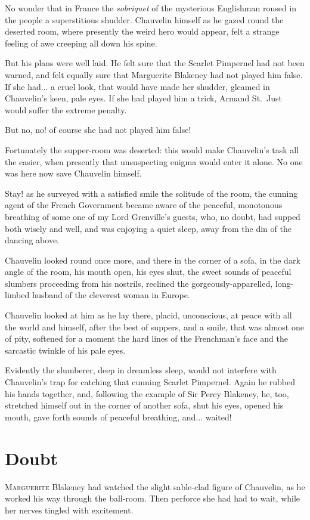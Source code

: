 \documentclass[paper=a5,BCOR=7mm,twoside,DIV=calc,12pt,usegeometry,chapterprefix,endperiod,headings=big]{scrbook}
\begin{document}
No wonder that in France the \textit{sobriquet} of the mysterious Englishman roused in the people a superstitious shudder. Chauvelin himself as he gazed round the deserted room, where presently the weird hero would appear, felt a strange feeling of awe creeping all down his spine.

But his plans were well laid. He felt sure that the Scarlet Pimpernel had not been warned, and felt equally sure that Marguerite Blakeney had not played him false. If she had... a cruel look, that would have made her shudder, gleamed in Chauvelin's keen, pale eyes. If she had played him a trick, Armand St.~Just would suffer the extreme penalty.

But no, no! of course she had not played him false!

Fortunately the supper-room was deserted: this would make Chauvelin's task all the easier, when presently that unsuspecting enigma would enter it alone. No one was here now save Chauvelin himself.

Stay! as he surveyed with a satisfied smile the solitude of the room, the cunning agent of the French Government became aware of the peaceful, monotonous breathing of some one of my Lord Grenville's guests, who, no doubt, had supped both wisely and well, and was enjoying a quiet sleep, away from the din of the dancing above.

Chauvelin looked round once more, and there in the corner of a sofa, in the dark angle of the room, his mouth open, his eyes shut, the sweet sounds of peaceful slumbers proceeding from his nostrils, reclined the gorgeously-apparelled, long-limbed husband of the cleverest woman in Europe.

Chauvelin looked at him as he lay there, placid, unconscious, at peace with all the world and himself, after the best of suppers, and a smile, that was almost one of pity, softened for a moment the hard lines of the Frenchman's face and the sarcastic twinkle of his pale eyes.

Evidently the slumberer, deep in dreamless sleep, would not interfere with Chauvelin's trap for catching that cunning Scarlet Pimpernel. Again he rubbed his hands together, and, following the example of Sir Percy Blakeney, he, too, stretched himself out in the corner of another sofa, shut his eyes, opened his mouth, gave forth sounds of peaceful breathing, and... waited!

\chapter{Doubt}
\lettrine[lines=4]{M}{arguerite} Blakeney had watched the slight sable-clad figure of Chauvelin, as he worked his way through the ball-room. Then perforce she had had to wait, while her nerves tingled with excitement.
\end{document}
